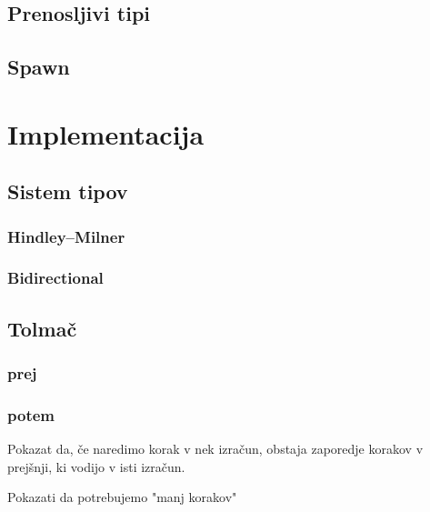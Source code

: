 \documentclass[12pt,a4paper,twoside]{article}
\theoremstyle{definition} %
\theoremstyle{plain} %
\numberwithin{equation}{section}  %
\begin{document}
\subsection{Prenosljivi tipi}

\subsection{Spawn}


\section{Implementacija}\label{sec:impl}

\subsection{Sistem tipov}\label{sec:tipi}

\subsubsection{Hindley–Milner}

\subsubsection{Bidirectional}


\subsection{Tolmač}\label{sec:interpreter}

\subsubsection{prej}

\subsubsection{potem}

Pokazat da, če naredimo korak v nek izračun, obstaja zaporedje korakov v prejšnji, ki vodijo v isti izračun.

Pokazati da potrebujemo "manj korakov" 
\end{document}
